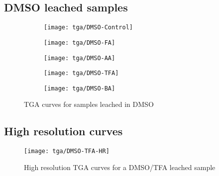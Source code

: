 \subsection{DMSO leached samples}
\begin{figure}[H]
    \centering

    \begin{subfigure}{0.46\linewidth}
        \texttt{[image: tga/DMSO-Control]}%
        \label{appx:def:fig:tga-dmso-cont}
    \end{subfigure}%

    \begin{subfigure}{0.46\linewidth}
        \texttt{[image: tga/DMSO-FA]}%
        \label{appx:def:fig:tga-dmso-fa}
    \end{subfigure}%
    \begin{subfigure}{0.46\linewidth}
        \texttt{[image: tga/DMSO-AA]}%
        \label{appx:def:fig:tga-dmso-aa}
    \end{subfigure}%

    \begin{subfigure}{0.46\linewidth}
        \texttt{[image: tga/DMSO-TFA]}%
        \label{appx:def:fig:tga-dmso-tfa}
    \end{subfigure}%
    \begin{subfigure}{0.46\linewidth}
        \texttt{[image: tga/DMSO-BA]}%
        \label{appx:def:fig:tga-dmso-ba}
    \end{subfigure}%

    \caption{\gls{TGA} curves for samples leached in \gls{DMSO}}%
\end{figure}

\subsection{High resolution curves}

\begin{figure}[H]

    \centering

    \texttt{[image: tga/DMSO-TFA-HR]}%
    \caption{High resolution \gls{TGA} curves for a \gls{DMSO}/\gls{TFA} leached sample}%
    \label{appx:def:fig:tga-dmso-tfa-hr}
\end{figure}
